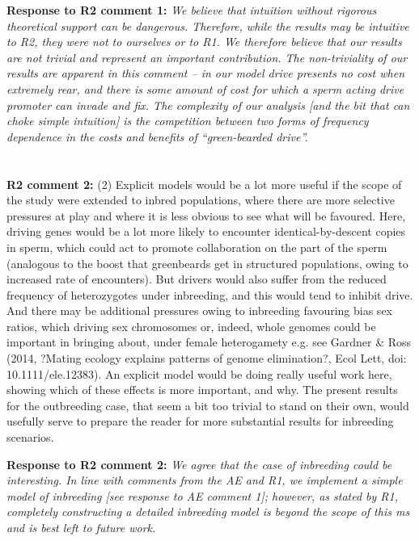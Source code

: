 \documentclass[12pt,letterpaper]{article}
\begin{document}
{\bf{Response to R2 comment 1:}} \emph{We believe that intuition without rigorous theoretical support can be dangerous. Therefore, while the results may be intuitive to R2, they were not to ourselves or to R1. We therefore believe that our results are not trivial and represent an important contribution. The non-triviality of our results are apparent in this comment -- in our model drive presents no cost when extremely rear, and there is some amount of cost for which a sperm acting drive promoter can invade and fix. The complexity of our analysis [and the bit that can choke simple intuition] is the competition between two forms of frequency dependence in the costs and benefits of ``green-bearded drive''.}
\\
\\
\\
{\bf{R2 comment 2:}} (2) Explicit models would be a lot more useful if the scope of the study were extended to inbred populations, where there are more selective pressures at play and where it is less obvious to see what will be favoured. Here, driving genes would be a lot more likely to encounter identical-by-descent copies in sperm, which could act to promote collaboration on the part of the sperm (analogous to the boost that greenbeards get in structured populations, owing to increased rate of encounters). But drivers would also suffer from the reduced frequency of heterozygotes under inbreeding, and this would tend to inhibit drive. And there may be additional pressures owing to inbreeding favouring bias sex ratios, which driving sex chromosomes or, indeed, whole genomes could be important in bringing about, under female heterogamety e.g. see Gardner \& Ross (2014, ?Mating ecology explains patterns of genome elimination?, Ecol Lett, doi: 10.1111/ele.12383). An explicit model would be doing really useful work here, showing which of these effects is more important, and why. The present results for the outbreeding case, that seem a bit too trivial to stand on their own, would usefully serve to prepare the reader for more substantial results for inbreeding scenarios.

{\bf{Response to R2 comment 2:}} \emph{We agree that the case of inbreeding could be interesting. In line with comments from the AE and R1, we implement a simple model of inbreeding [see response to AE comment 1]; however, as stated by R1, completely constructing a detailed inbreeding model is beyond the scope of this ms and is best left to future work. }
\end{document}
